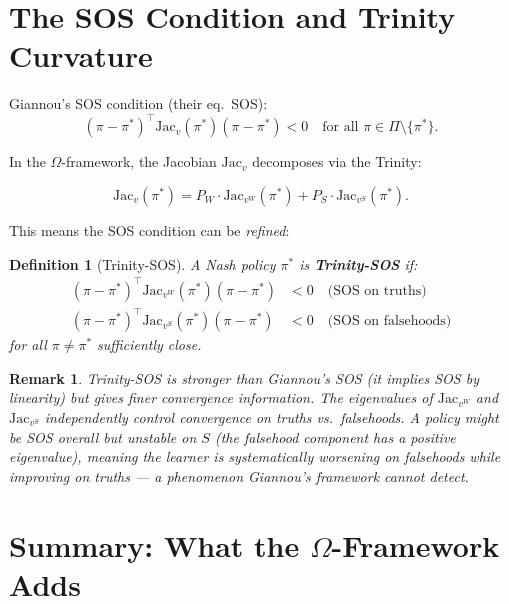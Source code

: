 \documentclass[11pt,a4paper]{article}
\newtheorem{definition}[theorem]{Definition}
\newtheorem{remark}[theorem]{Remark}
\begin{document}
\newpage
\section{The SOS Condition and Trinity Curvature}

Giannou's SOS condition (their eq.\ SOS):
\[
(\pi - \pi^*)^\top \text{Jac}_v(\pi^*)(\pi - \pi^*) < 0 \quad \text{for all } \pi \in \Pi \setminus \{\pi^*\}.
\]

In the $\Omega$-framework, the Jacobian $\text{Jac}_v$ decomposes via the Trinity:

\begin{equation}
\text{Jac}_v(\pi^*) = P_W \cdot \text{Jac}_{v^W}(\pi^*) + P_S \cdot \text{Jac}_{v^S}(\pi^*).
\label{eq:trinity-jac}
\end{equation}

This means the SOS condition can be \emph{refined}:

\begin{definition}[Trinity-SOS]
A Nash policy $\pi^*$ is \textbf{Trinity-SOS} if:
\begin{align}
(\pi - \pi^*)^\top \text{Jac}_{v^W}(\pi^*)(\pi - \pi^*) &< 0 \quad \text{(SOS on truths)} \label{eq:sos-W} \\
(\pi - \pi^*)^\top \text{Jac}_{v^S}(\pi^*)(\pi - \pi^*) &< 0 \quad \text{(SOS on falsehoods)} \label{eq:sos-S}
\end{align}
for all $\pi \neq \pi^*$ sufficiently close.
\end{definition}

\begin{remark}
Trinity-SOS is \emph{stronger} than Giannou's SOS (it implies SOS by linearity) but gives \emph{finer} convergence information. The eigenvalues of $\text{Jac}_{v^W}$ and $\text{Jac}_{v^S}$ independently control convergence on truths vs.\ falsehoods. A policy might be SOS overall but unstable on $S$ (the falsehood component has a positive eigenvalue), meaning the learner is systematically worsening on falsehoods while improving on truths — a phenomenon Giannou's framework cannot detect.
\end{remark}


\newpage
\section{Summary: What the $\Omega$-Framework Adds}
\end{document}
